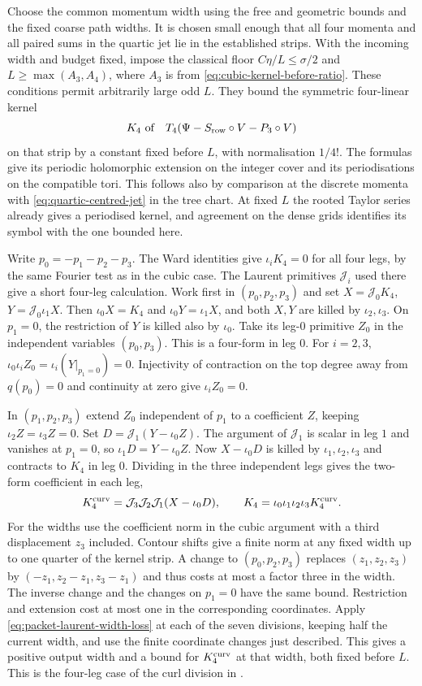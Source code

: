 \documentclass[11pt,reqno]{amsart}
\numberwithin{equation}{section}
\theoremstyle{definition}
\theoremstyle{remark}
\begin{document}
Choose the common momentum width using the free and
geometric bounds and the fixed coarse path widths. It is
chosen small enough that all four momenta and all paired sums
in the quartic jet lie in the established strips. With the
incoming width and budget fixed, impose the classical floor
\(C\eta/L\le\sigma/2\) and \(L\ge\max(A_3,A_4)\), where \(A_3\)
is from \eqref{eq:cubic-kernel-before-ratio}. These
conditions permit arbitrarily large odd \(L\). They bound
the symmetric four-linear kernel
\[
       K_4\ \text{of}\quad
       T_4(\Psi-S_{\rm row}\circ V-P_3\circ V)
\]
on that strip by a constant fixed before \(L\), with
normalisation \(1/4!\). The formulas give its periodic
holomorphic extension on the integer cover and its
periodisations on the compatible tori. This follows
also by comparison at the discrete momenta with
\eqref{eq:quartic-centred-jet} in the tree chart. At fixed
\(L\) the rooted Taylor series already gives a periodised
kernel, and agreement on the dense grids identifies
its symbol with the one bounded here.

Write \(p_0=-p_1-p_2-p_3\).
The Ward identities give \(\iota_iK_4=0\) for all four
legs, by the same Fourier test as in the cubic case.
The Laurent primitives \(\mathcal J_i\) used there give
a short four-leg calculation. Work first in
\((p_0,p_2,p_3)\) and set
\(X=\mathcal J_0K_4\), \(Y=\mathcal J_0\iota_1X\).
Then \(\iota_0X=K_4\) and \(\iota_0Y=\iota_1X\), and
both \(X,Y\) are killed by \(\iota_2,\iota_3\).
On \(p_1=0\), the restriction of \(Y\) is killed
also by \(\iota_0\). Take its leg-\(0\) primitive \(Z_0\)
in the independent variables \((p_0,p_3)\). This is
a four-form in leg \(0\). For \(i=2,3\),
\(\iota_0\iota_iZ_0=\iota_i(Y|_{p_1=0})=0\).
Injectivity of contraction on the top degree away from
\(q(p_0)=0\) and continuity at zero give \(\iota_iZ_0=0\).

In \((p_1,p_2,p_3)\) extend \(Z_0\) independent of \(p_1\)
to a coefficient \(Z\), keeping \(\iota_2Z=\iota_3Z=0\).
Set \(D=\mathcal J_1(Y-\iota_0Z)\). The argument of
\(\mathcal J_1\) is scalar in leg \(1\) and vanishes at
\(p_1=0\), so \(\iota_1D=Y-\iota_0Z\). Now \(X-\iota_0D\)
is killed by \(\iota_1,\iota_2,\iota_3\) and contracts
to \(K_4\) in leg \(0\). Dividing in the three independent
legs gives the two-form coefficient in each leg,
\[
 K_4^{\rm curv}=\mathcal J_3\mathcal J_2\mathcal J_1(X-\iota_0D),
 \qquad K_4=\iota_0\iota_1\iota_2\iota_3 K_4^{\rm curv}.
\]
For the widths use the coefficient norm in the cubic
argument with a third displacement \(z_3\) included.
Contour shifts give a finite norm at any fixed width
up to one quarter of the kernel strip. A change to
\((p_0,p_2,p_3)\) replaces \((z_1,z_2,z_3)\) by
\((-z_1,z_2-z_1,z_3-z_1)\) and thus costs at most a
factor three in the width. The inverse change and
the changes on \(p_1=0\) have the same bound.
Restriction and extension cost at most one in the
corresponding coordinates. Apply
\eqref{eq:packet-laurent-width-loss} at each of the
seven divisions, keeping half the current width,
and use the finite coordinate changes just described.
This gives a positive output width and a bound for
\(K_4^{\rm curv}\) at that width, both fixed before \(L\).
This is the four-leg case of the curl division in
\cite[Lemma~36.3, pp.~230--232]{Main}.
\end{document}
